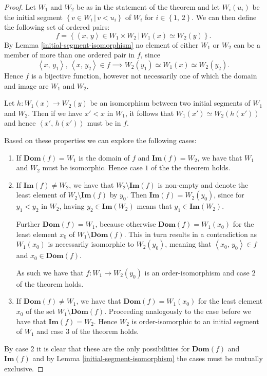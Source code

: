 \documentclass[../../main.tex]{subfiles}
\begin{document}
\begin{proof}
    Let $W_1$ and $W_2$ be as in the statement of the theorem and let $W_i(u_i)$ be the initial segment $\left\{v \in W_i \,\vert\, v < u_i\right\}$ of $W_i$ for $i \in \left\{1,\, 2\right\}$.
    We can then define the following set of ordered pairs:
    $$f = \left\{\left<x,\, y\right> \in W_1 \times W_2 \,\vert\, W_1(x) \simeq W_2(y)\right\}.$$
    By Lemma \ref{initial-segment-isomorphism} no element of either $W_1$ or $W_2$ can be a member of more than one ordered pair in $f$,
    since $$\left<x,\, y_1\right>,\, \left<x,\, y_2\right> \in f \implies W_2(y_1) \simeq W_1(x) \simeq W_2(y_2).$$
    Hence $f$ is a bijective function, however not necessarily one of which the domain and image are $W_1$ and $W_2$.
    
    Let $h: W_1(x) \to W_2(y)$ be an isomorphism between two initial segments of $W_1$ and $W_2$.
    Then if we have $x' < x$ in $W_1$, it follows that $W_1(x') \simeq W_2(h(x'))$ and hence $\left<x',\, h(x')\right>$ must be in $f$.

    Based on these properties we can explore the following cases:
    \begin{enumerate}
        \item If $\mathbf{Dom}(f) = W_1$ is the domain of $f$ and $\mathbf{Im}(f) = W_2$, we have that $W_1$ and $W_2$ must be isomorphic.
        Hence case $1$ of the the theorem holds.
        \item If $\mathbf{Im}(f) \neq W_2$, we have that $W_2 \setminus \mathbf{Im}(f)$ is non-empty and denote the least element of $W_2 \setminus \mathbf{Im}(f)$ by $y_0$.
        Then $\mathbf{Im}(f) = W_2(y_0)$, since for $y_1 < y_2$ in $W_2$, having $y_2 \in \mathbf{Im}(W_2)$ means that $y_1 \in \mathbf{Im}(W_2)$.

        Further $\mathbf{Dom}(f) = W_1$, because otherwise $\mathbf{Dom}(f) = W_1(x_0)$ for the least element $x_0$ of $W_1 \setminus \mathbf{Dom}(f)$.
        This in turn results in a contradiction as $W_1(x_0)$ is necessarily isomorphic to $W_2(y_0)$, meaning that $\left<x_0,\, y_0\right> \in f$ and $x_0 \in \mathbf{Dom}(f)$.

        As such we have that $f: W_1 \to W_2(y_0)$ is an order-isomorphism and case $2$ of the theorem holds.
        \item If $\mathbf{Dom}(f) \neq W_1$, we have that $\mathbf{Dom}(f) = W_1(x_0)$ for the least element $x_0$ of the set $W_1 \setminus \mathbf{Dom}(f)$.
        Proceeding analogously to the case before we have that $\mathbf{Im}(f) = W_2$. 
        Hence $W_2$ is order-isomorphic to an initial segment of $W_1$ and case $3$ of the theorem holds.
    \end{enumerate}
    By case 2 it is clear that these are the only possibilities for $\mathbf{Dom}(f)$ and $\mathbf{Im}(f)$ and by Lemma \ref{initial-segment-isomorphism} the cases must be mutually exclusive.
\end{proof}
\end{document}
